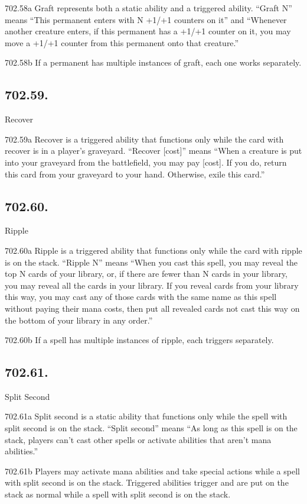 702.58a Graft represents both a static ability and a triggered ability. “Graft N” means “This permanent enters with N +1/+1 counters on it” and “Whenever another creature enters, if this permanent has a +1/+1 counter on it, you may move a +1/+1 counter from this permanent onto that creature.”

702.58b If a permanent has multiple instances of graft, each one works separately.

\subsection*{702.59.}
Recover

702.59a Recover is a triggered ability that functions only while the card with recover is in a player’s graveyard. “Recover [cost]” means “When a creature is put into your graveyard from the battlefield, you may pay [cost]. If you do, return this card from your graveyard to your hand. Otherwise, exile this card.”

\subsection*{702.60.}
Ripple

702.60a Ripple is a triggered ability that functions only while the card with ripple is on the stack. “Ripple N” means “When you cast this spell, you may reveal the top N cards of your library, or, if there are fewer than N cards in your library, you may reveal all the cards in your library. If you reveal cards from your library this way, you may cast any of those cards with the same name as this spell without paying their mana costs, then put all revealed cards not cast this way on the bottom of your library in any order.”

702.60b If a spell has multiple instances of ripple, each triggers separately.

\subsection*{702.61.}
Split Second

702.61a Split second is a static ability that functions only while the spell with split second is on the stack. “Split second” means “As long as this spell is on the stack, players can’t cast other spells or activate abilities that aren’t mana abilities.”

702.61b Players may activate mana abilities and take special actions while a spell with split second is on the stack. Triggered abilities trigger and are put on the stack as normal while a spell with split second is on the stack.

